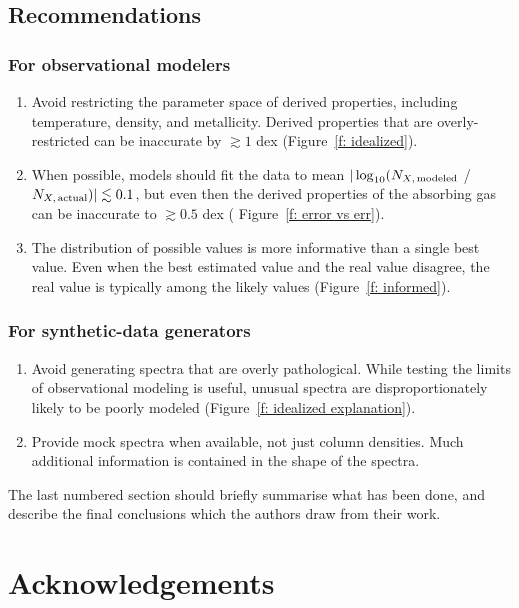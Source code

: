 \documentclass[fleqn,usenatbib]{mnras}
\begin{document}
\subsection{Recommendations}

\subsubsection{For observational modelers}

\begin{enumerate}
    \item Avoid restricting the parameter space of derived properties, including temperature, density, and metallicity. Derived properties that are overly-restricted can be inaccurate by $\gtrsim 1$ dex (Figure~\ref{f: idealized}).
    \item When possible, models should fit the data to mean $\vert \log_{10}( N_{X,\,{\rm modeled}}$ / $N_{X,\,{\rm actual}}) \vert \lesssim 0.1$, but even then the derived properties of the absorbing gas can be inaccurate to $\gtrsim 0.5$ dex ( Figure~\ref{f: error vs err}).
    \item The distribution of possible values is more informative than a single best value. Even when the best estimated value and the real value disagree, the real value is typically among the likely values (Figure~\ref{f: informed}).
\end{enumerate}

\subsubsection{For synthetic-data generators}

\begin{enumerate}
    \item Avoid generating spectra that are overly pathological. While testing the limits of observational modeling is useful, unusual spectra are disproportionately likely to be poorly modeled (Figure~\ref{f: idealized explanation}).
    \item Provide mock spectra when available, not just column densities. Much additional information is contained in the shape of the spectra.
\end{enumerate}

The last numbered section should briefly summarise what has been done, and describe
the final conclusions which the authors draw from their work.

\section*{Acknowledgements}
\end{document}
